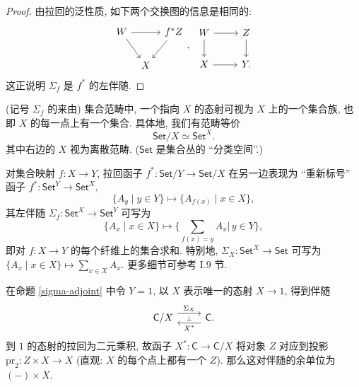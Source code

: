 \begin{proof}
    由拉回的泛性质, 如下两个交换图的信息是相同的:
    \[\begin{tikzcd}[ampersand replacement=\&,column sep=tiny]
    	W \&\& f^*Z \\
    	\& X
    	\arrow[from=1-1, to=1-3]
    	\arrow[from=1-1, to=2-2]
    	\arrow[from=1-3, to=2-2]
    \end{tikzcd},\ \begin{tikzcd}[ampersand replacement=\&]
    	W \& Z \\
    	X \& Y.
    	\arrow[from=1-1, to=1-2]
    	\arrow[from=1-1, to=2-1]
    	\arrow[from=2-1, to=2-2]
            \arrow[from=1-2, to=2-2]
    \end{tikzcd}\]
    这正说明 $\Sigma_f$ 是 $f^*$ 的左伴随.
\end{proof}



\begin{remark}
    {(记号 $\Sigma_f$ 的来由)}
    集合范畴中, 一个指向 $X$ 的态射可视为 $X$ 上的一个集合族, 也即 $X$ 的每一点上有一个集合. 具体地, 我们有范畴等价
    $$
    \mathsf {Set}/X \simeq \mathsf {Set}^X.
    $$
    其中右边的 $X$ 视为离散范畴. ($\mathsf {Set}$ 是集合丛的 ``分类空间''.)
    
    对集合映射 $f\colon X \to Y$, 拉回函子 $f^* \colon \mathsf {Set}/Y \to \mathsf {Set}/X$ 在另一边表现为 ``重新标号'' 函子 $f^*\colon \mathsf {Set}^Y \to \mathsf {Set}^X,$
    $$
    \{A_y \mid y\in Y\} \mapsto \{A_{f(x)}\mid x\in X\},
    $$
    其左伴随 $\Sigma_f \colon \mathsf {Set}^X \to \mathsf {Set}^Y$ 可写为
    $$
    \{A_x\mid x\in X\}\mapsto \Big\{\sum_{f(x)=y}A_x \Big|\, y\in Y\Big\},
    $$
    即对 $f \colon X \to Y$ 的每个纤维上的集合求和.
    特别地,
    $\Sigma_X \colon \mathsf {Set}^X \to \mathsf {Set}$
    可写为
    $\{A_x \mid x\in X\} \mapsto \sum_{x\in X} A_x$.
    更多细节可参考 \cite{SGL} I.9 节.
\end{remark}

\begin{example}
    {}
    在命题 \ref{sigma-adjoint} 中令 $Y=1$, 以 $X$ 表示唯一的态射 $X\to 1$, 得到伴随
    \[\begin{tikzcd}[ampersand replacement=\&]
        	{\mathsf C /X} \& {\mathsf C.}
        	\arrow[""{name=0, anchor=center, inner sep=0}, "{\Sigma_X}", shift left=2, from=1-1, to=1-2]
        	\arrow[""{name=1, anchor=center, inner sep=0}, "{X^*}", shift left=2, from=1-2, to=1-1]
        	\arrow["\dashv"{anchor=center, rotate=-90}, draw=none, from=0, to=1]
    \end{tikzcd}\]
    到 $1$ 的态射的拉回为二元乘积, 故函子 $X^* \colon \mathsf C \to \mathsf C/X$ 将对象 $Z$ 对应到投影 $\text{pr}_2 \colon Z\times X \to X$ (直观: $X$ 的每个点上都有一个 $Z$). 那么这对伴随的余单位为 $(-)\times X$.
\end{example}

